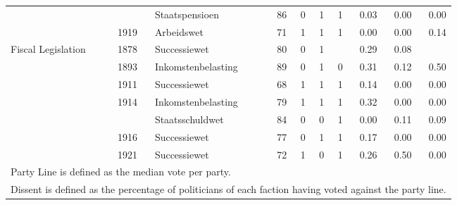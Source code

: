 \begin{table}
\begin{tabular}[t]{lllrrrrrrr}
 &  & Staatspensioen & 86 & \num{0} & \num{1} & \num{1} & \num{0.03} & \num{0.00} & \num{0.00}\\
 & 1919 & Arbeidswet & 71 & \num{1} & \num{1} & \num{1} & \num{0.00} & \num{0.00} & \num{0.14}\\
Fiscal Legislation & 1878 & Successiewet & 80 & \num{0} & \num{1} &  & \num{0.29} & \num{0.08} & \\
 & 1893 & Inkomstenbelasting & 89 & \num{0} & \num{1} & \num{0} & \num{0.31} & \num{0.12} & \num{0.50}\\
 & 1911 & Successiewet & 68 & \num{1} & \num{1} & \num{1} & \num{0.14} & \num{0.00} & \num{0.00}\\
 & 1914 & Inkomstenbelasting & 79 & \num{1} & \num{1} & \num{1} & \num{0.32} & \num{0.00} & \num{0.00}\\
 &  & Staatsschuldwet & 84 & \num{0} & \num{0} & \num{1} & \num{0.00} & \num{0.11} & \num{0.09}\\
 & 1916 & Successiewet & 77 & \num{0} & \num{1} & \num{1} & \num{0.17} & \num{0.00} & \num{0.00}\\
 & 1921 & Successiewet & 72 & \num{1} & \num{0} & \num{1} & \num{0.26} & \num{0.50} & \num{0.00}\\
\bottomrule
\multicolumn{10}{l}{\rule{0pt}{1em}Party Line is defined as the median vote per party.}\\
\multicolumn{10}{l}{\rule{0pt}{1em}Dissent is defined as the percentage of politicians of each faction having voted against the party line.}\\
\end{tabular}
\end{table}
